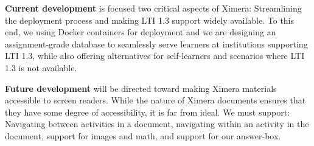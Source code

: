 \documentclass[twocolumn]{article}
\begin{document}
\begin{xframe}
    {\sffamily\bfseries Current development} is focused two critical
    aspects of Ximera: Streamlining the deployment
    process and making LTI 1.3 support widely available.
    To this end, we using Docker containers for deployment  and we are
    designing an assignment-grade
    database to seamlessly serve  learners at institutions supporting LTI 1.3,
    while also
    offering alternatives for self-learners and scenarios where
    LTI 1.3 is not available.
    \begin{center}
    \end{center}
\end{xframe}
\begin{xframe}
    {\sffamily\bfseries Future development} will be directed toward making
    Ximera materials accessible to screen readers. While the nature of Ximera
    documents ensures that they have some degree of accessibility, it is far from
    ideal.  We must support: Navigating
    between activities in a document, navigating within an activity in the
    document, support for images and math, and support for our answer-box.
\end{xframe}

\restoregeometry
\end{document}
